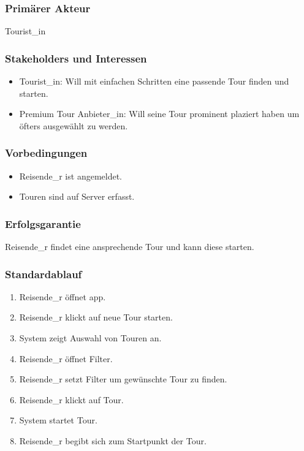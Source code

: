 \documentclass[a4paper,10pt,xetex]{article}
\begin{document}
\subsubsection{Primärer Akteur}\label{primuxe4rer-akteur}
Tourist\_in


\subsubsection{Stakeholders und Interessen}\label{stakeholders-und-interessen}
\begin{itemize}
  \item Tourist\_in: Will mit einfachen Schritten eine passende Tour finden und starten.
  \item Premium Tour Anbieter\_in: Will seine Tour prominent plaziert haben um öfters ausgewählt zu werden.
\end{itemize}


\subsubsection{Vorbedingungen}\label{vorbedingungen}
\begin{itemize}
  \item Reisende\_r ist angemeldet.
  \item Touren sind auf Server erfasst.
\end{itemize}


\subsubsection{Erfolgsgarantie}\label{erfolgsgarantie}
Reisende\_r findet eine ansprechende Tour und kann diese starten.


\subsubsection{Standardablauf}\label{standardablauf}
\begin{enumerate}
  \item Reisende\_r öffnet app.
  \item Reisende\_r klickt auf neue Tour starten.
  \item System zeigt Auswahl von Touren an.
  \item Reisende\_r öffnet Filter.
  \item Reisende\_r setzt Filter um gewünschte Tour zu finden.
  \item Reisende\_r klickt auf Tour.
  \item System startet Tour.
  \item Reisende\_r begibt sich zum Startpunkt der Tour.
\end{enumerate}
\end{document}
